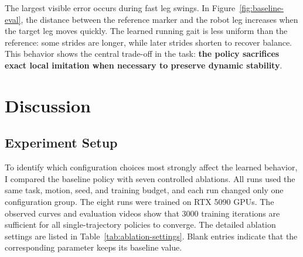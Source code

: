 \documentclass[UTF8]{ctexart}
\begin{document}
The largest visible error occurs during fast leg swings. In Figure~\ref{fig:baseline-eval}, the distance between the reference marker and the robot leg increases when the target leg moves quickly. The learned running gait is less uniform than the reference: some strides are longer, while later strides shorten to recover balance. This behavior shows the central trade-off in the task: \textbf{the policy sacrifices exact local imitation when necessary to preserve dynamic stability}.

\section{Discussion}

\subsection{Experiment Setup}

To identify which configuration choices most strongly affect the learned behavior, I compared the baseline policy with seven controlled ablations. All runs used the same task, motion, seed, and training budget, and each run changed only one configuration group. The eight runs were trained on RTX 5090 GPUs. The observed curves and evaluation videos show that 3000 training iterations are sufficient for all single-trajectory policies to converge. The detailed ablation settings are listed in  Table~\ref{tab:ablation-settings}. Blank entries indicate that the corresponding parameter keeps its baseline value.
\end{document}
